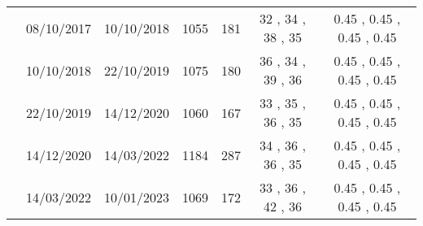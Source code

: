 \begin{table}[htbp]
{\begin{adjustwidth}{0in}{0in}
\begin{tabular}{ccccccc}
				& 08/10/2017                      & 10/10/2018                    & 1055                       & 181                       & 32                          , 34                          , 38                          , 35                          & 0.45                        , 0.45                        , 0.45                        , 0.45                        \\
				& 10/10/2018                      & 22/10/2019                    & 1075                       & 180                       & 36                          , 34                          , 39                          , 36                          & 0.45                        , 0.45                        , 0.45                        , 0.45                        \\
				& 22/10/2019                      & 14/12/2020                    & 1060                       & 167                       & 33                          , 35                          , 36                          , 35                          & 0.45                        , 0.45                        , 0.45                        , 0.45                        \\
				& 14/12/2020                      & 14/03/2022                    & 1184                       & 287                       & 34                          , 36                          , 36                          , 35                          & 0.45                        , 0.45                        , 0.45                        , 0.45                        \\
				& 14/03/2022                      & 10/01/2023                    & 1069                       & 172                       & 33                          , 36                          , 42                          , 36                          & 0.45                        , 0.45                        , 0.45                        , 0.45                       
				\\ 
				\bottomrule
			\end{tabular}
		\end{adjustwidth}
	}
	
	
\end{table}
\restoregeometry

\newpage

